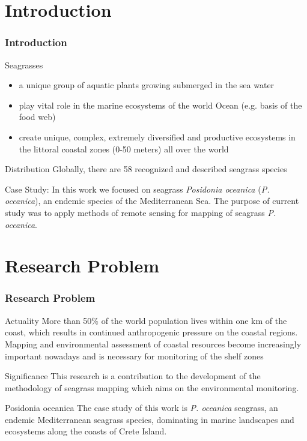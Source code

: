 \documentclass[pdflatex,compress,9pt,
	xcolor={dvipsnames,dvipsnames,svgnames,x11names,table},
	hyperref={colorlinks = true,breaklinks = true, urlcolor = NavyBlue, breaklinks = true}]{beamer}
\begin{document}
\section{Introduction}
\begin{frame}\frametitle{Introduction}

\begin{alertblock}{Seagrasses}
\begin{itemize}
	\item a unique group of aquatic plants growing submerged in the sea water
	\item play vital role in the marine ecosystems of the world Ocean (e.g. basis of the food web)
	\item create unique, complex, extremely diversified and productive ecosystems in the littoral coastal zones (0-50 meters) all over the world
\end{itemize}
\end{alertblock}

\begin{block}{Distribution}
Globally, there are 58 recognized and described seagrass species
\end{block}

\begin{examples}{Case Study:}
In this work we focused on seagrass \emph{Posidonia oceanica} (\emph{P. oceanica}), an endemic species of the Mediterranean Sea. The purpose of current study was to apply methods of remote sensing for mapping of seagrass \emph{P. oceanica}.
\end{examples}

\end{frame}

\section{Research Problem}
\begin{frame}\frametitle{Research Problem}

\begin{alertblock}{Actuality}
More than 50\% of the world population lives within one km of the coast, which results in continued anthropogenic pressure on the coastal regions.  Mapping and environmental assessment of coastal resources become increasingly important nowadays and is necessary for monitoring of the shelf zones
\end{alertblock}

\begin{block}{Significance}
This research is a contribution to the development of the methodology of seagrass mapping which aims on
the environmental monitoring.
\end{block}

\begin{block}{Posidonia oceanica}
The case study of this work is \emph{P. oceanica} seagrass, an endemic Mediterranean seagrass species, dominating in marine landscapes and ecosystems along the coasts of Crete Island.
\end{block}

\end{frame}
\end{document}
